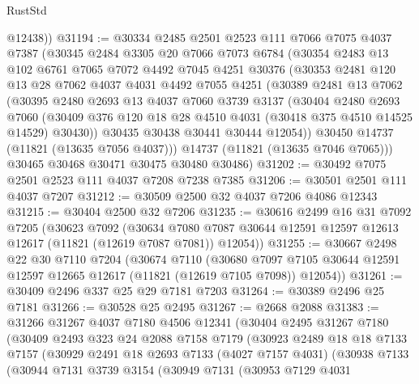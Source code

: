 \begin{lexlean}{RustStd}
\begin{coremodule}
        @12438))
@31194 := @30334
    @2485
    @2501
    @2523
    @111
    @7066
    @7075
    @4037
    @7387
    (@30345
      @2484
      @3305
      @20
      @7066
      @7073
      @6784
      (@30354
        @2483
        @13
        @102
        @6761
        @7065
        @7072
        @4492
        @7045
        @4251
        @30376
        (@30353
          @2481
          @120
          @13
          @28
          @7062
          @4037
          @4031
          @4492
          @7055
          @4251
          (@30389
            @2481
            @13
            @7062
            (@30395
              @2480
              @2693
              @13
              @4037
              @7060
              @3739
              @3137
              (@30404
                @2480
                @2693
                @7060
                (@30409 @376 @120 @18 @28 @4510 @4031 (@30418 @375 @4510 @14525 @14529) @30430))
              @30435
              @30438
              @30441
              @30444
              @12054))
          @30450
          @14737
          (@11821 (@13635 @7056 @4037)))
        @14737
        (@11821 (@13635 @7046 @7065)))
      @30465
      @30468
      @30471
      @30475
      @30480
      @30486)
@31202 := @30492 @7075 @2501 @2523 @111 @4037 @7208 @7238 @7385
@31206 := @30501 @2501 @111 @4037 @7207
@31212 := @30509 @2500 @32 @4037 @7206 @4086 @12343
@31215 := @30404 @2500 @32 @7206
@31235 := @30616
    @2499
    @16
    @31
    @7092
    @7205
    (@30623
      @7092
      (@30634 @7080 @7087 @30644 @12591 @12597 @12613 @12617 (@11821 (@12619 @7087 @7081)) @12054))
@31255 := @30667
    @2498
    @22
    @30
    @7110
    @7204
    (@30674
      @7110
      (@30680 @7097 @7105 @30644 @12591 @12597 @12665 @12617 (@11821 (@12619 @7105 @7098)) @12054))
@31261 := @30409 @2496 @337 @25 @29 @7181 @7203
@31264 := @30389 @2496 @25 @7181
@31266 := @30528 @25 @2495
@31267 := @2668 @2088
@31383 := @31266
    @31267
    @4037
    @7180
    @4506
    @12341
    (@30404
      @2495
      @31267
      @7180
      (@30409
        @2493
        @323
        @24
        @2088
        @7158
        @7179
        (@30923
          @2489
          @18
          @18
          @7133
          @7157
          (@30929
            @2491
            @18
            @2693
            @7133
            (@4027 @7157 @4031)
            (@30938
              @7133
              (@30944
                @7131
                @3739
                @3154
                (@30949
                  @7131
                  (@30953
                    @7129
                    @4031

\end{coremodule}
\end{lexlean}
